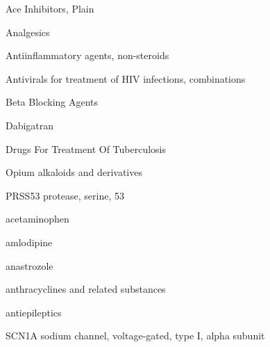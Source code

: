 \documentclass{resume} %
\begin{document}
\begin{rSection}{ Ace Inhibitors, Plain }
\begin{rSection}{ Analgesics }
\begin{rSection}{ Antiinflammatory agents, non-steroids }
\begin{rSection}{ Antivirals for treatment of HIV infections, combinations }
\begin{rSection}{ Beta Blocking Agents }
\begin{rSection}{ Dabigatran }
\begin{rSection}{ Drugs For Treatment Of Tuberculosis }
\begin{rSection}{ Opium alkaloids and derivatives }
\begin{rSubsection}{ PRSS53 }{ protease, serine, 53 }{}{}
\end{rSubsection}
\end{rSection}\begin{rSection}{ acetaminophen }
\item[]
\begin{rSection}{ amlodipine }
\item[]
\begin{rSection}{ anastrozole }
\item[]
\begin{rSection}{ anthracyclines and related substances }
\item[]
\begin{rSection}{ antiepileptics }
\item[]
\begin{rSubsection}{ SCN1A }{ sodium channel, voltage-gated, type I, alpha subunit }{}{}
\item[]


\end{rSubsection}
\end{rSection}
\end{rSection}
\end{rSection}
\end{rSection}
\end{rSection}
\end{rSection}
\end{rSection}
\end{rSection}
\end{rSection}
\end{rSection}
\end{rSection}
\end{rSection}
\end{document}
